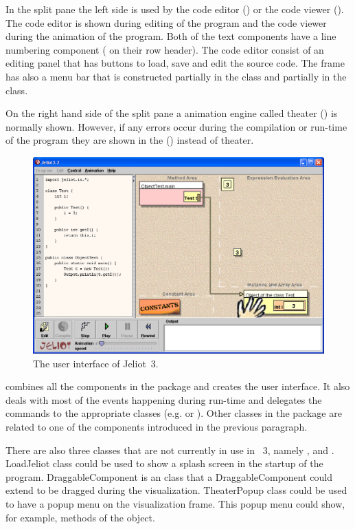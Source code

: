 In the split pane the left side is used by the code editor () or the code viewer (). The code editor is shown during editing of the program and the code viewer during the animation of the program. Both of the text components have a line numbering component ( on their row header). The code editor consist of an editing panel that has buttons to load, save and edit the source code. The frame has also a menu bar that is constructed partially in the  class and partially in the  class.

On the right hand side of the split pane a animation engine called the\-a\-ter () is normally shown. However, if any errors occur during the compilation or run-time of the program they are shown in the  () instead of theater.

\begin{figure}[htb]
\begin{center}
\includegraphics[width=\textwidth]{images/jeliot3.eps}
\caption{The user interface of Jeliot~3.}
\label{fig:jeliot3_UI}
\end{center}
\end{figure}

 combines all the components in the  package and creates the user interface. It also deals with most of the events happening during {run-time} and delegates the commands to the appropriate classes (e.g.  or ). Other classes in the  package are related to one of the components introduced in the previous paragraph.

There are also three classes that are not currently in use in \jel{}~3, namely ,  and . LoadJeliot class could be used to show a splash screen in the startup of the program. DraggableComponent is an class that a DraggableComponent could extend to be dragged during the visualization. TheaterPopup class could be used to have a popup menu on the visualization frame. This popup menu could show, for example, methods of the object.

